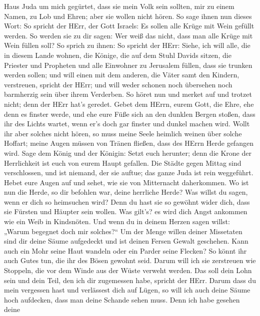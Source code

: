 Haus Juda um mich gegürtet, dass sie mein Volk sein sollten, mir zu
einem Namen, zu Lob und Ehren; aber sie wollen nicht hören.
 So sage ihnen nun dieses Wort: So spricht der HErr, der
Gott Israels: Es sollen alle Krüge mit Wein gefüllt werden. So werden
sie zu dir sagen: Wer weiß das nicht, dass man alle Krüge mit Wein
füllen soll?  So sprich zu ihnen: So spricht der HErr:
Siehe, ich will alle, die in diesem Lande wohnen, die Könige, die auf
dem Stuhl Davids sitzen, die Priester und Propheten und alle Einwohner
zu Jerusalem füllen, dass sie trunken werden sollen;  und
will einen mit dem anderen, die Väter samt den Kindern, verstreuen,
spricht der HErr; und will weder schonen noch übersehen noch barmherzig
sein über ihrem Verderben.  So höret nun und merket auf und
trotzet nicht; denn der HErr hat's geredet.  Gebet dem
HErrn, eurem Gott, die Ehre, ehe denn es finster werde, und ehe eure
Füße sich an den dunklen Bergen stoßen, dass ihr des Lichts wartet, wenn
er's doch gar finster und dunkel machen wird.  Wollt ihr
aber solches nicht hören, so muss meine Seele heimlich weinen über
solche Hoffart; meine Augen müssen von Tränen fließen, dass des HErrn
Herde gefangen wird.  Sage dem König und der Königin: Setzt
euch herunter; denn die Krone der Herrlichkeit ist euch von eurem Haupt
gefallen.  Die Städte gegen Mittag sind verschlossen, und
ist niemand, der sie auftue; das ganze Juda ist rein weggeführt.
 Hebet eure Augen auf und sehet, wie sie von Mitternacht
daherkommen. Wo ist nun die Herde, so dir befohlen war, deine herrliche
Herde?  Was willst du sagen, wenn er dich so heimsuchen
wird? Denn du hast sie so gewöhnt wider dich, dass sie Fürsten und
Häupter sein wollen. Was gilt's? es wird dich Angst ankommen wie ein
Weib in Kindsnöten.  Und wenn du in deinem Herzen sagen
willst: „Warum begegnet doch mir solches?{}`` Um der Menge willen deiner
Missetaten sind dir deine Säume aufgedeckt und ist deinen Fersen Gewalt
geschehen.  Kann auch ein Mohr seine Haut wandeln oder ein
Parder seine Flecken? So könnt ihr auch Gutes tun, die ihr des Bösen
gewohnt seid.  Darum will ich sie zerstreuen wie Stoppeln,
die vor dem Winde aus der Wüste verweht werden.  Das soll
dein Lohn sein und dein Teil, den ich dir zugemessen habe, spricht der
HErr. Darum dass du mein vergessen hast und verlässest dich auf Lügen,
 so will ich auch deine Säume hoch aufdecken, dass man
deine Schande sehen muss.  Denn ich habe gesehen deine
